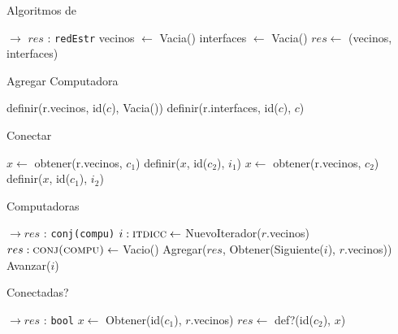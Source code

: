 \begin{Algoritmos}


\begin{algorithm}
  \caption{Algoritmos de }
\begin{algorithmic}[1]
   $\to$ $res$ : \texttt{redEstr}
  \State vecinos $\gets$ Vacia()
  \State interfaces $\gets$ Vacia()
  \State $res \gets$ (vecinos, interfaces)
  \EndProcedure
\end{algorithmic}
\end{algorithm}


\begin{algorithm}
\caption{Agregar Computadora}
\begin{algorithmic}[1]
  \State definir(r.vecinos, id($c$), Vacia())
  \State definir(r.interfaces, id($c$), $c$)
 \EndProcedure
\end{algorithmic}
\end{algorithm}


\begin{algorithm}
\caption{Conectar}
\begin{algorithmic}[1]
  \State $x \gets$ obtener(r.vecinos, $c_1$)
  \State definir($x$, id($c_2$), $i_1$)
  \State $x \gets$ obtener(r.vecinos, $c_2$)
  \State definir($x$, id($c_1$), $i_2$)
 \EndProcedure
\end{algorithmic}
\end{algorithm}



\begin{algorithm}
\caption{Computadoras}
\begin{algorithmic}[1]
   $\to res$ : \texttt{conj(compu)}
  \State $i :\textsc{itdicc} \gets$ NuevoIterador($r$.vecinos)
  \State $res :\textsc{conj(compu)} \gets$ Vacio()
    \State Agregar($res$, Obtener(Siguiente($i$), $r$.vecinos))
    \State Avanzar($i$)
  \EndWhile
 \EndProcedure
\end{algorithmic}
\end{algorithm}


\begin{algorithm}
\caption{Conectadas?}
\begin{algorithmic}[1]
    $\to res$ : \texttt{bool}
  \State $x \gets$ Obtener(id($c_1$), $r$.vecinos)
  \State $res \gets$ def?(id($c_2$), $x$)
 \EndProcedure
\end{algorithmic}
\end{algorithm}



\end{Algoritmos}
